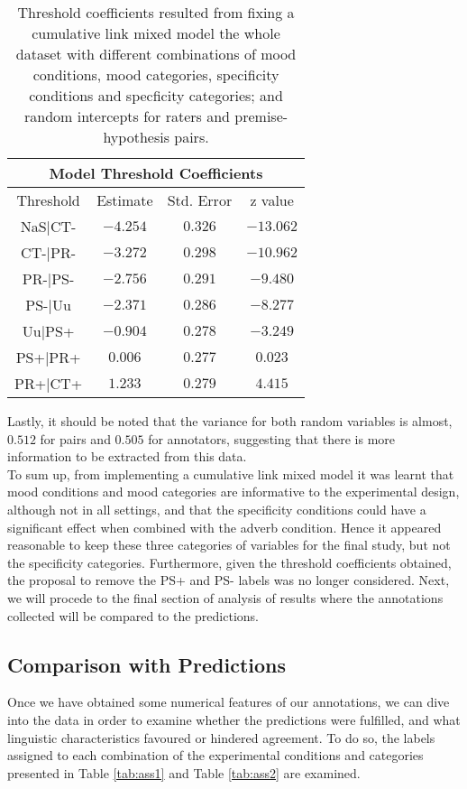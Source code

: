 \begin{table}
\centering
\begin{tabular}{|c|c|c|c|}
\hline
\multicolumn{4}{|c|}{Model Threshold Coefficients}\\\hline
Threshold &  Estimate & Std. Error & z value\\\hline
NaS|CT- & $-4.254$ & $0.326$ & $-13.062$\\\hline
CT-|PR- & $-3.272$ & $0.298$ & $-10.962$\\\hline
PR-|PS- & $-2.756$ & $0.291$ & $ -9.480$\\\hline
PS-|Uu  & $-2.371$ & $0.286$ & $ -8.277$\\\hline
Uu|PS+  & $-0.904$ & $0.278$ & $ -3.249$\\\hline
PS+|PR+ & $ 0.006$ & $0.277$ & $  0.023$\\\hline
PR+|CT+ & $ 1.233$ & $0.279$ & $  4.415$\\\hline
\end{tabular}
\caption[Threshold coefficients.]{Threshold coefficients resulted from fixing a cumulative link mixed model the whole dataset with different combinations of mood conditions, mood categories, specificity conditions and specficity categories; and random intercepts for raters and premise-hypothesis pairs.}
\label{tab:modthres}
\end{table}

Lastly, it should be noted that the variance for both random variables is almost, $0.512$ for pairs and $0.505$ for annotators, suggesting that there is more information to be extracted from this data.\\

To sum up, from implementing a cumulative link mixed model it was learnt that mood conditions and mood categories are informative to the experimental design, although not in all settings, and that the specificity conditions could have a significant effect when combined with the adverb condition. Hence it appeared reasonable to keep these three categories of variables for the final study, but not the specificity categories. Furthermore, given the threshold coefficients obtained, the proposal to remove the PS+ and PS- labels was no longer considered. Next, we will procede to the final section of analysis of results where the annotations collected will be compared to the predictions.\\

\subsection{Comparison with Predictions}
\label{subsec:pilcompred}
Once we have obtained some numerical features of our annotations, we can dive into the data in order to examine whether the predictions were fulfilled, and what linguistic characteristics favoured or hindered agreement. To do so, the labels assigned to each combination of the experimental conditions and categories presented in Table \ref{tab:ass1} and Table \ref{tab:ass2} are examined.\\

